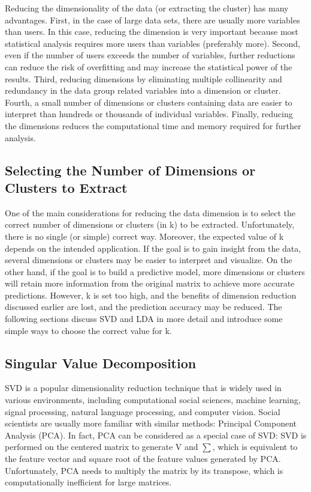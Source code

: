 Reducing the dimensionality of the data (or extracting the cluster)
 has many advantages. First, in the case of large data sets, there
 are usually more variables than users. In this case, reducing the
 dimension is very important because most statistical analysis 
requires more users than variables (preferably more). Second, even
 if the number of users exceeds the number of variables, further 
reductions can reduce the risk of overfitting and may increase the
 statistical power of the results. Third, reducing dimensions by 
eliminating multiple collinearity and redundancy in the data group
 related variables into a dimension or cluster. Fourth, a small 
number of dimensions or clusters containing data are easier to 
interpret than hundreds or thousands of individual variables. 
Finally, reducing the dimensions reduces the computational time and
 memory required for further analysis.

\subsection{Selecting the Number of Dimensions or Clusters to Extract}

One of the main considerations for reducing the data dimension is 
to select the correct number of dimensions or clusters (in k) to be
 extracted. Unfortunately, there is no single (or simple) correct 
way. Moreover, the expected value of k depends on the intended 
application. If the goal is to gain insight from the data, several
 dimensions or clusters may be easier to interpret and visualize. 
On the other hand, if the goal is to build a predictive model, more
 dimensions or clusters will retain more information from the 
original matrix to achieve more accurate predictions. However, k is
 set too high, and the benefits of dimension reduction discussed 
earlier are lost, and the prediction accuracy may be reduced. The 
following sections discuss SVD and LDA in more detail and introduce
 some simple ways to choose the correct value for k.

\subsection{Singular Value Decomposition}

SVD is a popular dimensionality reduction technique that is widely
 used in various environments, including computational social 
sciences, machine learning, signal processing, natural language 
processing, and computer vision. Social scientists are usually more
 familiar with similar methods: Principal Component Analysis (PCA).
 In fact, PCA can be considered as a special case of SVD: SVD is 
performed on the centered matrix to generate V and $\sum$, 
which is equivalent
 to the feature vector and square root of the feature values 
generated by PCA. Unfortunately, PCA needs to multiply the matrix 
by its transpose, which is computationally inefficient for large 
matrices.

